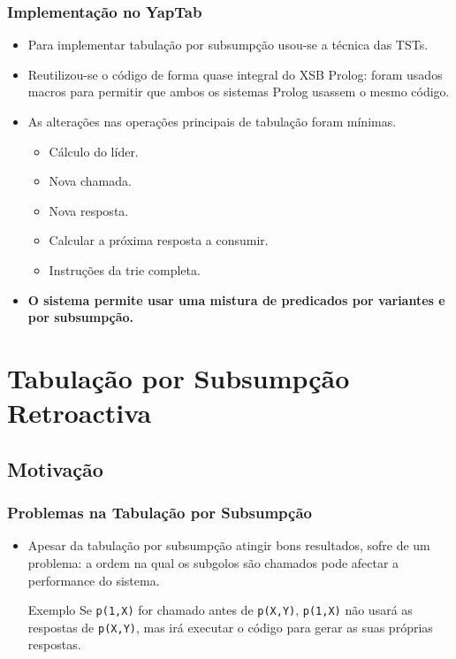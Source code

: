 \documentclass{beamer}
\begin{document}
\begin{frame}
   \frametitle{Implementação no YapTab}
   \begin{itemize}
      \item Para implementar tabulação por subsumpção usou-se a técnica das TSTs.
      \item Reutilizou-se o código de forma quase integral do XSB Prolog: foram usados macros para
      permitir que ambos os sistemas Prolog usassem o mesmo código.
      \item As alterações nas operações principais de tabulação foram mínimas.
      \begin{itemize}
         \pause
         \item Cálculo do líder.
         \pause
         \item Nova chamada.
         \pause
         \item Nova resposta.
         \pause
         \item Calcular a próxima resposta a consumir.
         \pause
         \item Instruções da trie completa.
      \end{itemize}
      \pause
      \item \textbf{O sistema permite usar uma mistura de predicados por variantes e por subsumpção.}
   \end{itemize}
\end{frame}

\section{Tabulação por Subsumpção Retroactiva}

\subsection{Motivação}

\begin{frame}
   \frametitle{Problemas na Tabulação por Subsumpção}
   \begin{itemize}
      \item Apesar da tabulação por subsumpção atingir bons resultados, sofre de um problema:
      a ordem na qual os subgolos são chamados pode afectar a performance do sistema.
      
      \begin{block}{Exemplo}
         Se \texttt{p(1,X)} for chamado antes de \texttt{p(X,Y)}, \texttt{p(1,X)} não usará as respostas de
         \texttt{p(X,Y)}, mas irá executar o código para gerar as suas próprias respostas.
      \end{block}

   \end{itemize}
\end{frame}
\end{document}
